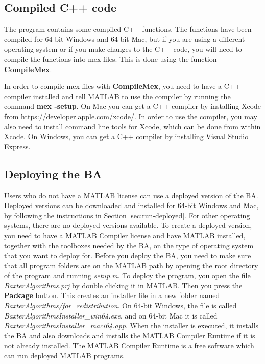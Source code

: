\documentclass[a4paper, oneside, onecolumn, 11pt]{article}
\newcommand{\file}[1]{\emph{#1}}
\newcommand{\command}[1]{\textbf{#1}}
\newcommand{\control}[1]{\textbf{#1}}
\begin{document}
\subsection{Compiled C++ code}
\label{sec:compile}
The program contains some compiled C++ functions. The functions have been compiled for 64-bit Windows and 64-bit Mac, but if you are using a different operating system or if you make changes to the C++ code, you will need to compile the functions into mex-files. This is done using the function \command{CompileMex}.

In order to compile mex files with \command{CompileMex}, you need to have a C++ compiler installed and tell MATLAB to use the compiler by running the command \command{mex -setup}. On Mac you can get a C++ compiler by installing Xcode from \url{https://developer.apple.com/xcode/}. In order to use the compiler, you may also need to install command line tools for Xcode, which can be done from within Xcode. On Windows, you can get a C++ compiler by installing Visual Studio Express.

\subsection{Deploying the BA}
\label{sec:deploy}
Users who do not have a MATLAB license can use a deployed version of the BA. Deployed versions can be downloaded and installed for 64-bit Windows and Mac, by following the instructions in Section \ref{sec:run-deployed}. For other operating systems, there are no deployed versions available. To create a deployed version, you need to have a MATLAB Compiler license and have MATLAB installed, together with the toolboxes needed by the BA, on the type of operating system that you want to deploy for. Before you deploy the BA, you need to make sure that all program folders are on the MATLAB path by opening the root directory of the program and running \file{setup.m}. To deploy the program, you open the file \file{BaxterAlgorithms.prj} by double clicking it in MATLAB. Then you press the \control{Package} button. This creates an installer file in a new folder named \file{BaxterAlgorithms/for\_redistribution}. On 64-bit Windows, the file is called \file{BaxterAlgorithmsInstaller\_win64.exe}, and on 64-bit Mac it is called \file{BaxterAlgorithmsInstaller\_maci64.app}. When the installer is executed, it installs the BA and also downloads and installs the MATLAB Compiler Runtime if it is not already installed. The MATLAB Compiler Runtime is a free software which can run deployed MATLAB programs.
\end{document}
